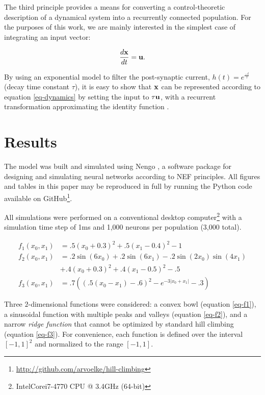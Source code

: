 \documentclass[letterpaper, 10 pt, conference]{ieeeconf}  %
\newcommand{\bolds}[1]{{\bf #1}}
\begin{document}
The third principle provides a means for converting a control-theoretic description of a dynamical system into a recurrently connected population. For the purposes of this work, we are mainly interested in the simplest case of integrating an input vector:

\begin{equation} \label{eq-dynamics}
\frac{d\bolds{x}}{dt} = \bolds{u}.
\end{equation}

By using an exponential model to filter the post-synaptic current, $h(t) = e^{\frac{-t}{\tau}}$ (decay time constant $\tau$), it is easy to show that $\bolds{x}$ can be represented according to equation \ref{eq-dynamics} by setting the input to $\tau \bolds{u}$, with a recurrent transformation approximating the identity function \cite{conklin2005}.

\section{Results}

The model was built and simulated using Nengo \cite{bekolay2013nengo}, a software package for designing and simulating neural networks according to NEF principles. All figures and tables in this paper may be reproduced in full by running the Python code available on GitHub\footnote{\url{http://github.com/arvoelke/hill-climbing}}.

All simulations were performed on a conventional desktop computer\footnote{Intel\textregistered\enspace Core\texttrademark\enspace i7-4770 CPU @ 3.4GHz (64-bit)} with a simulation time step of 1ms and 1,000 neurons per population (3,000 total).

\begingroup\makeatletter{}\check@mathfonts{}%
\begin{align}%
\label{eq-f1} f_1(x_0, x_1) &= .5(x_0 + 0.3)^2 + .5(x_1 - 0.4)^2 - 1 \\
\label{eq-f2} f_2(x_0, x_1) &= .2\sin(6x_0) + .2\sin(6x_1) - .2\sin(2x_0)\sin(4x_1) \nonumber \\ & + .4(x_0 + 0.3)^2 + .4(x_1 - 0.5)^2 - .5 \\
\label{eq-f3} f_3(x_0, x_1) &= .7((.5(x_0 - x_1) - .6)^2 - e^{-3|x_0 + x_1|} - .3)
\end{align}
\endgroup

Three $2$-dimensional functions were considered: a convex bowl (equation \ref{eq-f1}), a sinusoidal function with multiple peaks and valleys (equation \ref{eq-f2}), and a narrow {\it ridge function} that cannot be optimized by standard hill climbing (equation \ref{eq-f3}). For convenience, each function is defined over the interval $[-1, 1]^2$ and normalized to the range $[-1, 1]$.
\end{document}

